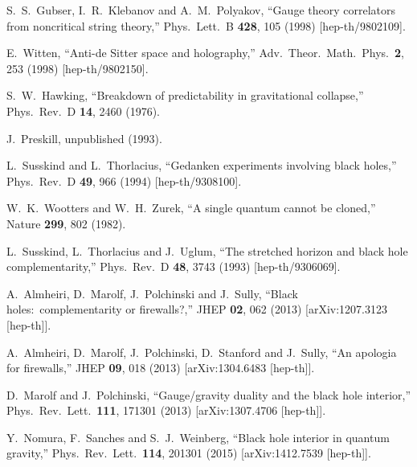 \documentclass[12pt]{article}
\begin{document}
\begin{thebibliography}{99}
S.~S.~Gubser, I.~R.~Klebanov and A.~M.~Polyakov,
``Gauge theory correlators from noncritical string theory,''
Phys.\ Lett.\ B {\bf 428}, 105 (1998)
[hep-th/9802109].

E.~Witten,
``Anti-de Sitter space and holography,''
Adv.\ Theor.\ Math.\ Phys.\  {\bf 2}, 253 (1998)
[hep-th/9802150].

S.~W.~Hawking,
``Breakdown of predictability in gravitational collapse,''
Phys.\ Rev.\ D {\bf 14}, 2460 (1976).

J.~Preskill,
unpublished (1993).

L.~Susskind and L.~Thorlacius,
``Gedanken experiments involving black holes,''
Phys.\ Rev.\ D {\bf 49}, 966 (1994)
[hep-th/9308100].

W.~K.~Wootters and W.~H.~Zurek,
``A single quantum cannot be cloned,''
Nature {\bf 299}, 802 (1982).

L.~Susskind, L.~Thorlacius and J.~Uglum,
``The stretched horizon and black hole complementarity,''
Phys.\ Rev.\ D {\bf 48}, 3743 (1993)
[hep-th/9306069].

A.~Almheiri, D.~Marolf, J.~Polchinski and J.~Sully,
``Black holes:\ complementarity or firewalls?,''
JHEP {\bf 02}, 062 (2013)
[arXiv:1207.3123 [hep-th]].

A.~Almheiri, D.~Marolf, J.~Polchinski, D.~Stanford and J.~Sully,
``An apologia for firewalls,''
JHEP {\bf 09}, 018 (2013)
[arXiv:1304.6483 [hep-th]].

D.~Marolf and J.~Polchinski,
``Gauge/gravity duality and the black hole interior,''
Phys.\ Rev.\ Lett.\ {\bf 111}, 171301 (2013)
[arXiv:1307.4706 [hep-th]].

Y.~Nomura, F.~Sanches and S.~J.~Weinberg,
``Black hole interior in quantum gravity,''
Phys.\ Rev.\ Lett.\ {\bf 114}, 201301 (2015)
[arXiv:1412.7539 [hep-th]].


\end{thebibliography}
\end{document}
